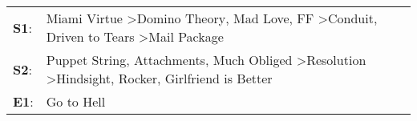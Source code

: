 \begin{supertabular}{p{0.03\textwidth}p{0.92\textwidth}}
 \textbf{S1}:  &  Miami Virtue\textsuperscript{} \textgreater \enspace Domino Theory\textsuperscript{}, \enspace Mad Love\textsuperscript{}, \enspace FF\textsuperscript{} \textgreater \enspace Conduit\textsuperscript{}, \enspace Driven to Tears\textsuperscript{} \textgreater \enspace Mail Package\textsuperscript{}  \enspace  \\
 \textbf{S2}:  &  Puppet String\textsuperscript{}, \enspace Attachments\textsuperscript{}, \enspace Much Obliged\textsuperscript{} \textgreater \enspace Resolution\textsuperscript{} \textgreater \enspace Hindsight\textsuperscript{}, \enspace Rocker\textsuperscript{}, \enspace Girlfriend is Better\textsuperscript{}  \enspace  \\
 \textbf{E1}:  &                                                                                                                                                                                                                                                                               Go to Hell\textsuperscript{}  \enspace  \\
\end{supertabular}
